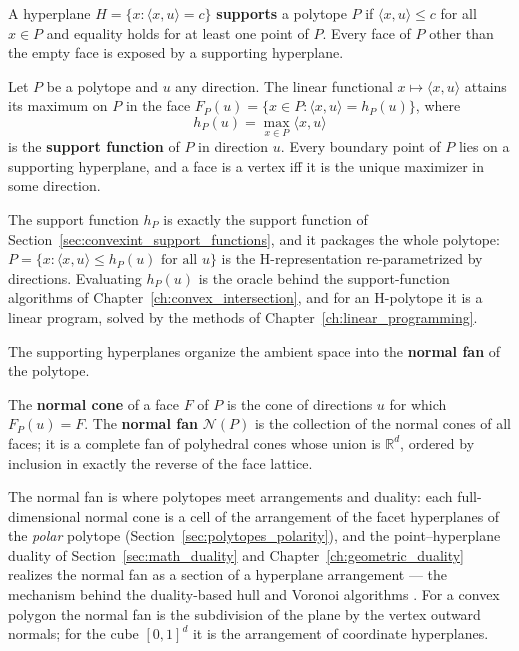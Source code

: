 \begin{definition}\label{def:polytopes_supporting_hyperplane}
  A hyperplane $H = \{ x : \langle x, u \rangle = c \}$ \textbf{supports} a
  polytope $P$ if $\langle x, u \rangle \le c$ for all $x \in P$ and
  equality holds for at least one point of $P$. Every face of $P$ other than
  the empty face is exposed by a supporting hyperplane.
\end{definition}

\begin{theorem}\label{thm:polytopes_supporting}
  Let $P$ be a polytope and $u$ any direction. The linear functional
  $x \mapsto \langle x, u \rangle$ attains its maximum on $P$ in the face
  $F_P(u) = \{ x \in P : \langle x, u \rangle = h_P(u) \}$, where
  \[
    h_P(u) = \max_{x \in P} \langle x, u \rangle
  \]
  is the \textbf{support function} of $P$ in direction $u$. Every boundary
  point of $P$ lies on a supporting hyperplane, and a face is a vertex iff
  it is the unique maximizer in some direction.
\end{theorem}

The support function $h_P$ is exactly the support function of
Section~\ref{sec:convexint_support_functions}, and it packages the whole
polytope: $P = \{ x : \langle x, u \rangle \le h_P(u) \text{ for all } u \}$
is the H-representation re-parametrized by directions. Evaluating $h_P(u)$ is
the oracle behind the support-function algorithms of
Chapter~\ref{ch:convex_intersection}, and for an H-polytope it is a linear
program, solved by the methods of Chapter~\ref{ch:linear_programming}.

The supporting hyperplanes organize the ambient space into the
\textbf{normal fan} of the polytope.

\begin{definition}\label{def:polytopes_normal_cone}
  The \textbf{normal cone} of a face $F$ of $P$ is the cone of directions
  $u$ for which $F_P(u) = F$. The \textbf{normal fan} $\mathcal{N}(P)$ is
  the collection of the normal cones of all faces; it is a complete fan of
  polyhedral cones whose union is $\mathbb{R}^d$, ordered by inclusion in
  exactly the reverse of the face lattice.
\end{definition}

The normal fan is where polytopes meet arrangements and duality: each
full-dimensional normal cone is a cell of the arrangement of the facet
hyperplanes of the \emph{polar} polytope (Section~\ref{sec:polytopes_polarity}),
and the point--hyperplane duality of Section~\ref{sec:math_duality} and
Chapter~\ref{ch:geometric_duality} realizes the normal fan as a section of a
hyperplane arrangement --- the mechanism behind the duality-based hull and
Voronoi algorithms \cite{edelsbrunner1987,chazelle1985power}. For a convex
polygon the normal fan is the subdivision of the plane by the vertex
outward normals; for the cube $[0,1]^d$ it is the arrangement of coordinate
hyperplanes.

